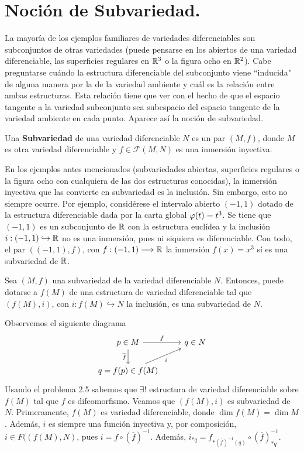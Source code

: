 \documentclass[cursovd_portada.tex]{subfiles}
\begin{document}
\section{Noción de Subvariedad.}
\hs La mayoría de los ejemplos familiares de variedades
diferenciables son subconjuntos de otras variedades (puede
pensarse en los abiertos de una variedad diferenciable, las
superficies re\-gu\-la\-res en $\mathbb{R}^3$ o la figura ocho en $\mathbb{R}^2$).
Cabe preguntarse cuándo la estructura diferenciable del
subconjunto viene ``inducida" de alguna manera por la de la
variedad ambiente y cuál es la relación entre ambas
estructuras. Esta relación tiene que ver con el hecho de que
el espacio tangente a la variedad subconjunto sea subespacio del
espacio tangente de la variedad ambiente en cada punto. Aparece
así la noción de subvariedad.
\begin{defi}
Una {\bf Subvariedad} de una variedad diferenciable $N$ es un par $(M,f)$, donde $M$ es otra variedad
diferenciable y $f\in\mathcal{F}(M,N)$ es una inmersión inyectiva.
\end{defi}
En los ejemplos antes mencionados (subvariedades abiertas,
superficies re\-gu\-la\-res o la figura ocho con cualquiera de las
dos estructuras conocidas), la inmersión inyectiva que las
convierte en subvariedad es la inclusión. Sin embargo, esto no
siempre ocurre. Por ejemplo, considérese el intervalo abierto
$(-1,1)$ dotado de la estructura diferenciable dada por la carta
global $\varphi(t)=t^3$. Se tiene que $(-1,1)$ es un subconjunto de
$\mathbb{R}$ con la estructura euclídea y la inclusión
$i:(-1,1)\hookrightarrow\mathbb{R}$ no es una inmersión, pues ni
siquiera es diferenciable. Con todo, el par $((-1,1),f)$, con
$f:(-1,1)\longrightarrow\mathbb{R}$ la inmersión $f(x)=x^3$ sí es una
subvariedad de $\mathbb{R}$.
\begin{prop}\label{prop}
Sea $(M,f)$ una subvariedad de la variedad diferenciable $N$.
Entonces, puede dotarse a $f(M)$ de una estructura de variedad
diferenciable tal que $(f(M),i)$, con $i:f(M)\hookrightarrow N$ la
inclusión, es una subvariedad de $N$.
\end{prop}
\begin{dem} Observemos el siguiente diagrama
\[
\begin{tikzcd}
p\in M\arrow[r,"f"]\arrow[d,"\overline{f}"'] & q\in N\\
q=f(p)\in f(M)\arrow[ur,"i"'] 
\end{tikzcd}
\]
Usando el problema 2.5 sabemos que $\exists!$ estructura de variedad diferenciable sobre $f(M)$ tal que $f$ es difeomorfismo. Veamos que $(f(M),i)$ es subvariedad de $N$. Primeramente, $f(M)$ es variedad diferenciable, donde $\dim f(M)=\dim M$. Además, $i$ es siempre una función inyectiva y, por composición, $i\in F((f(M),N)$, pues $ i = f \circ (\overline{f})^{-1}$. Además, $i_{\ast q} = f_{\ast (\overline{f})^{-1}(q)}\circ (\overline{f})^{-1}_{\ast q}$.

\end{dem}
\end{document}
